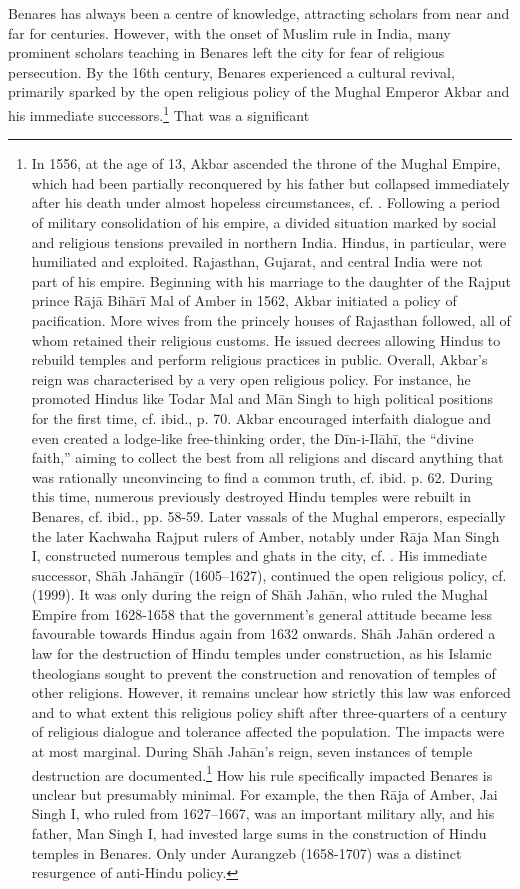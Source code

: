 Benares has always been a centre of knowledge, attracting scholars from near and far for centuries. However, with the onset of Muslim rule in India, many prominent scholars teaching in Benares left the city for fear of religious persecution. By the 16th century, Benares experienced a cultural revival, primarily sparked by the open religious policy of the Mughal Emperor Akbar and his immediate successors.\footnote{In 1556, at the age of 13, Akbar ascended the throne of the Mughal Empire, which had been partially reconquered by his father but collapsed immediately after his death under almost hopeless circumstances, cf. \citeauthor[1989: 53]{stietencron1989}. Following a period of military consolidation of his empire, a divided situation marked by social and religious tensions prevailed in northern India. Hindus, in particular, were humiliated and exploited. Rajasthan, Gujarat, and central India were not part of his empire. Beginning with his marriage to the daughter of the Rajput prince Rājā Bihārī Mal of Amber in 1562, Akbar initiated a policy of pacification. More wives from the princely houses of Rajasthan followed, all of whom retained their religious customs. He issued decrees allowing Hindus to rebuild temples and perform religious practices in public. Overall, Akbar's reign was characterised by a very open religious policy. For instance, he promoted Hindus like Todar Mal and Mān Singh to high political positions for the first time, cf. ibid., p. 70. Akbar encouraged interfaith dialogue and even created a lodge-like free-thinking order, the Dīn-i-Ilāhī, the ``divine faith,'' aiming to collect the best from all religions and discard anything that was rationally unconvincing to find a common truth, cf. ibid. p. 62. During this time, numerous previously destroyed Hindu temples were rebuilt in Benares, cf. ibid., pp. 58-59. Later vassals of the Mughal emperors, especially the later Kachwaha Rajput rulers of Amber, notably under Rāja Man Singh I, constructed numerous temples and ghats in the city, cf. \citeauthor[2006: 493-495]{hooja2006}. His immediate successor, Shāh Jahāngīr (1605–1627), continued the open religious policy, cf. \citeauthor{jahangir1999} (1999). It was only during the reign of Shāh Jahān, who ruled the Mughal Empire from 1628-1658 that the government's general attitude became less favourable towards Hindus again from 1632 onwards. Shāh Jahān ordered a law for the destruction of Hindu temples under construction, as his Islamic theologians sought to prevent the construction and renovation of temples of other religions. However, it remains unclear how strictly this law was enforced and to what extent this religious policy shift after three-quarters of a century of religious dialogue and tolerance affected the population. The impacts were at most marginal. During Shāh Jahān's reign, seven instances of temple destruction are documented.\footnote{Cf. \citeauthor{eaton2001}.} How his rule specifically impacted Benares is unclear but presumably minimal. For example, the then Rāja of Amber, Jai Singh I, who ruled from 1627–1667, was an important military ally, and his father, Man Singh I, had invested large sums in the construction of Hindu temples in Benares. Only under Aurangzeb (1658-1707) was a distinct resurgence of anti-Hindu policy.} That was a significant 